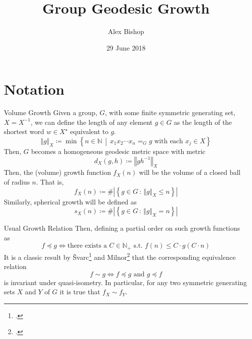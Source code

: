 \documentclass{beamer}
\author{Alex Bishop}
\title{Group Geodesic Growth}
\institute{University of Technology, Sydney}
\date{29 June 2018}
\renewcommand{\leq}{\leqslant}
\begin{document}
\begin{frame}[plain]
	\maketitle
\end{frame}

\section{Notation}

\begin{frame}{Volume Growth}
Given a group, $G$, with some finite symmetric generating set, $X = X^{-1}$, we can define the length of any element $g \in G$ as the length of the shortest word $w \in X^\star$ equivalent to $g$.
\[
  \left\Vert g \right\Vert_X
  \coloneqq
  \min
  \left\{
    n \in \mathbb{N}
    \, \middle\vert \,
    x_1 x_2 \cdots x_n =_G g \text{ with each } x_j \in X
  \right\}
\]
Then, $G$ becomes a homogeneous geodesic metric space with metric
\[
  d_X(g,h) \coloneqq \left\Vert g h^{-1} \right\Vert_X
\]
Then, the (volume) growth function $f_X(n)$ will be the volume of a closed ball of radius $n$.
That is,
\[
  f_X(n) \coloneqq \#\left\vert
  	\left\{
  	  g \in G
  	  \,:\,
  	  \left\Vert g \right\Vert_X \leq n
  	\right\}
   \right\vert
\]
Similarly, spherical growth will be defined as
\[
  s_X(n) \coloneqq \#\left\vert
  \left\{
  	g \in G
  \,:\,
  	\left\Vert g \right\Vert_X = n
  \right\}
  \right\vert
\]
\end{frame}

\begin{frame}{Usual Growth Relation}
Then, defining a partial order on such growth functions as
\[
  f \preccurlyeq g
  \iff
  \text{there exists a }C\in \mathbb{N}_+\text{ s.t. }
  f(n) \leq C \cdot g(C\cdot n)
\]
It is a classic result by \v{S}varc\footcite{SvarcEquivClass} and Milnor\footcite{MilnorEquivClass} that the corresponding equivalence relation
\[
  f\sim g \iff f \preccurlyeq g \text{ and } g \preccurlyeq f
\]
is invariant under quasi-isometry.
In particular, for any two symmetric generating sets $X$ and $Y$ of $G$ it is true that $f_X \sim f_Y$.
\end{frame}
\end{document}

